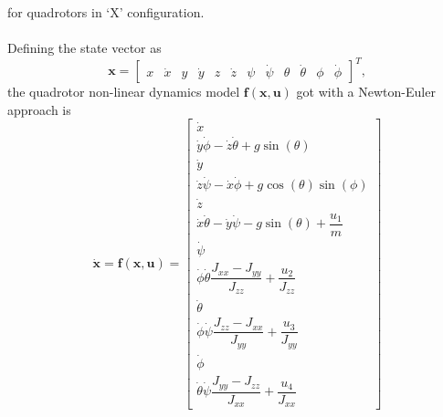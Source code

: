 for quadrotors in `X' configuration.
\\\\
Defining the state vector as
\setcounter{MaxMatrixCols}{20}
\begin{equation}
\mathbf{x} = \begin{bmatrix}
x & \dot{x} & y & \dot{y} & z & \dot{z} & \psi & \dot{\psi} & \theta & \dot{\theta} & \phi & \dot{\phi}
\end{bmatrix}^{T},
\end{equation} 
the quadrotor non-linear dynamics model $\mathbf{f(x,u)}$ got with a Newton-Euler approach is
\begin{equation}
\mathbf{\dot{x}} = \mathbf{f(x,u)} = \begin{bmatrix}
\dot{x} \\[5pt]
\dot{y} \dot{\phi} - \dot{z} \dot{\theta} + g \sin(\theta) \\[5pt]
\dot{y} \\[5pt]
\dot{z} \dot{\psi} - \dot{x} \dot{\phi} + g \cos(\theta)\sin(\phi) \\[5pt]
\dot{z} \\[5pt]
\dot{x} \dot{\theta} - \dot{y} \dot{\psi} - g \sin(\theta) + \dfrac{u_{1}}{m} \\[5pt]
\dot{\psi} \\[5pt]
\dot{\phi}\dot{\theta} \dfrac{J_{xx}-J_{yy}}{J_{zz}} + \dfrac{u_{2}}{J_{zz}} \\[5pt]
\dot{\theta} \\[5pt]
\dot{\phi} \dot{\psi}\dfrac{J_{zz}-J_{xx}}{J_{yy}} + \dfrac{u_{3}}{J_{yy}} \\[5pt]
\dot{\phi} \\[5pt]
\dot{\theta}\dot{\psi}\dfrac{J_{yy}-J_{zz}}{J_{xx}} + \dfrac{u_{4}}{J_{xx}}
\end{bmatrix}
\end{equation}

